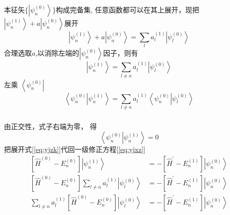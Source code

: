 \begin{frame}
  \frametitle{}
本征矢$\{ \left| \psi_n^{(0)} \right\rangle\}$构成完备集, 任意函数都可以在其上展开，现把 $ \left|\psi_n^{(1)}\right\rangle + a \left|\psi_n^{(0)}\right\rangle  $展开 
\[ \left|\psi_n^{(1)}\right\rangle + a \left|\psi_n^{(0)}\right\rangle  =\sum_l a_l^{(1)} \left|\psi_l^{(0)}\right\rangle \]
合理选取$a$,以消除左端的$\left|\psi_n^{(0)}\right\rangle$因子，则有
\begin{equation}\label{eq:yjzk}
  \left|\psi_n^{(1)}\right\rangle =\sum_{l\ne n} a_l^{(1)} \left|\psi_l^{(0)}\right\rangle 
\end{equation}
左乘 $\left\langle \psi_n^{(0)} \right|$
\[ \left\langle \psi_n^{(0)} \left| \psi_n^{(1)}\right\rangle \right.=\sum_{l\ne n} a_l^{(1)} \left\langle \psi_n^{(0)} \left|\psi_l^{(0)}\right\rangle \right.\]
\end{frame} 

\begin{frame}
  \frametitle{}
由正交性，式子右端为零， 得
\[ \left\langle \psi_n^{(0)} \left| \psi_n^{(1)}\right\rangle \right.=0\]
把展开式[\ref{eq:yjzk}]代回一级修正方程[\ref{eq:yjxz}]
\begin{equation*}
 \begin{aligned}
   \left[\hat{H}^{(0)}-E_n^{(0)}\right]\left|\psi_n^{(1)}\right\rangle  &= -\left[\hat{H}^{\prime}-E_n^{(1)}\right]\left| \psi_n^{(0)}\right\rangle \\ 
   \left[\hat{H}^{(0)}-E_n^{(0)}\right]\sum_{l\ne n} a_l^{(1)} \left|\psi_l^{(0)}\right\rangle   &= -\left[\hat{H}^{\prime}-E_n^{(1)}\right]\left| \psi_n^{(0)}\right\rangle \\
   \sum_{l\ne n} a_l^{(1)}\left[\hat{H}^{(0)}-E_n^{(0)}\right] \left|\psi_l^{(0)}\right\rangle   &= -\left[\hat{H}^{\prime}-E_n^{(1)}\right]\left| \psi_n^{(0)}\right\rangle   
 \end{aligned}
\end{equation*}
\end{frame} 

